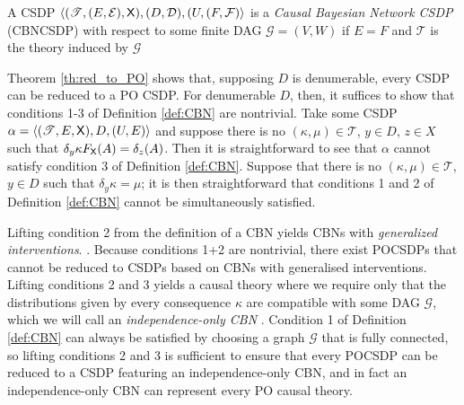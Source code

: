 \begin{definition}
A CSDP $\langle (\mathscr{T},(E,\mathcal{E}),\mathsf{X}),(D,\mathcal{D}), (U,(F,\mathcal{F})\rangle$ is a \emph{Causal Bayesian Network CSDP} (CBNCSDP) with respect to some finite DAG $\mathcal{G}=(V,W)$ if $E=F$ and $\mathscr{T}$ is the theory induced by $\mathcal{G}$ 

Theorem \ref{th:red_to_PO} shows that, supposing $D$ is denumerable, every CSDP can be reduced to a PO CSDP. For denumerable $D$, then, it suffices to show that conditions 1-3 of Definition \ref{def:CBN} are nontrivial. Take some CSDP $\alpha=\langle (\mathscr{T},E,\mathsf{X}),D,(U,E) \rangle$ and suppose there is no $(\kappa,\mu)\in \mathscr{T}$, $y\in D$, $z\in X$ such that $\delta_y\kappa F_{\mathsf{X}} (A) = \delta_{z} (A)$. Then it is straightforward to see that $\alpha$ cannot satisfy condition 3 of Definition \ref{def:CBN}. Suppose that there is no $(\kappa,\mu)\in \mathscr{T}$, $y\in D$ such that $\delta_y \kappa = \mu$; it is then straightforward that conditions 1 and 2 of Definition \ref{def:CBN} cannot be simultaneously satisfied.  

Lifting condition 2 from the definition of a CBN yields CBNs with \emph{generalized interventions}. . Because conditions 1+2 are nontrivial, there exist POCSDPs that cannot be reduced to CSDPs based on CBNs with generalised interventions. Lifting conditions 2 and 3 yields a causal theory where we require only that the distributions given by every consequence $\kappa$ are compatible with some DAG $\mathcal{G}$, which we will call an \emph{independence-only CBN} . Condition 1 of Definition \ref{def:CBN} can always be satisfied by choosing a graph $\mathcal{G}$ that is fully connected, so lifting conditions 2 and 3 is sufficient to ensure that every POCSDP can be reduced to a CSDP featuring an independence-only CBN, and in fact an independence-only CBN can represent every PO causal theory. 


\end{definition}
